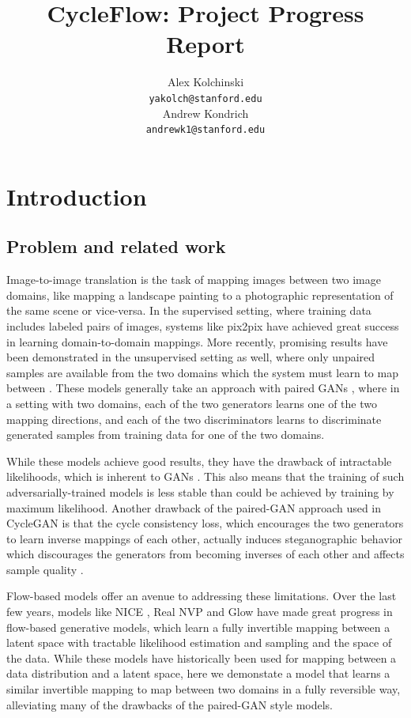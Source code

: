 \documentclass{article}
\title{CycleFlow: Project Progress Report}
\author{
  Alex Kolchinski\\
  \texttt{yakolch@stanford.edu}\\
  \And
  Andrew Kondrich\\
  \texttt{andrewk1@stanford.edu}\\
}
\begin{document}

\maketitle
\section{Introduction}
\subsection{Problem and related work}
Image-to-image translation is the task of mapping images between two image domains, like mapping a landscape painting to a photographic representation of the same scene or vice-versa. In the supervised setting, where training data includes labeled pairs of images, systems like pix2pix \citep{isola2017image} have achieved great success in learning domain-to-domain mappings. More recently, promising results have been demonstrated in the unsupervised setting as well, where only unpaired samples are available from the two domains which the system must learn to map between \citep{zhu2017unpaired, yi2017dualgan, kim2017learning}. These models generally take an approach with paired GANs \citep{goodfellow2014generative}, where in a setting with two domains, each of the two generators learns one of the two mapping directions, and each of the two discriminators learns to discriminate generated samples from training data for one of the two domains. 

While these models achieve good results, they have the drawback of intractable likelihoods, which is inherent to GANs \citep{kingma2018glow}. This also means that the training of such adversarially-trained models is less stable than could be achieved by training by maximum likelihood. Another drawback of the paired-GAN approach used in CycleGAN \citep{zhu2017unpaired} is that the cycle consistency loss, which encourages the two generators to learn inverse mappings of each other, actually induces steganographic behavior which discourages the generators from becoming inverses of each other and affects sample quality \citep{chu2017cyclegan}. 

Flow-based models offer an avenue to addressing these limitations. Over the last few years, models like NICE \citep{dinh2014nice}, Real NVP \citep{dinh2016density} and Glow \citep{kingma2018glow} have made great progress in flow-based generative models, which learn a fully invertible mapping between a latent space with tractable likelihood estimation and sampling and the space of the data. While these models have historically been used for mapping between a data distribution and a latent space, here we demonstate a model that learns a similar invertible mapping to map between two domains in a fully reversible way, alleviating many of the drawbacks of the paired-GAN style models. 
\end{document}

